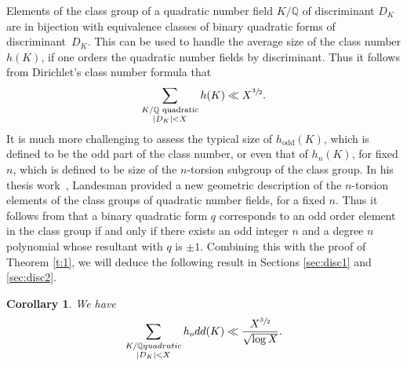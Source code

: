 \documentclass[11pt]{article}
\newcommand{\QQ}{\mathbb{Q}}\let\Q\QQ
\newtheorem{corollary}[theorem]{Corollary}
\numberwithin{equation}{section}
\begin{document}
Elements of the
class group of a quadratic number field $K/\QQ$ of discriminant $D_K$ are in bijection with equivalence classes
of binary quadratic forms of discriminant~$D_K$. This can be used to
handle the average size of the class number $h(K)$, if one orders the quadratic number fields by discriminant. Thus it follows from Dirichlet's class number formula that
\begin{equation}\label{eq:class}
\sum_{
\substack{K/\QQ \text{ quadratic}\\
|D_K| < X
}} h(K)\ll X^{\sfrac{3}{2}}.
\end{equation}
It is much more challenging to assess the typical size of
$h_\text{odd}(K)$, which is defined to be the odd part of the class number, or even that of
$h_n(K)$, for fixed $n$, which is defined to be size of the $n$-torsion subgroup of the class group.
In his thesis work~\cite{aaron}, Landesman provided
a new geometric description of the $n$-torsion elements of the class groups of quadratic number fields, for a fixed $n$. Thus it follows from
\cite[Th.\,1.1]{aaron} that a binary quadratic form $q$ corresponds to an odd order
element in the class group
if and only if there exists an odd integer $n$
and a degree $n$ polynomial whose resultant with $q$ is $\pm 1$. Combining this with the proof of
Theorem \ref{t:1}, we will deduce the following result in Sections \ref{sec:disc1} and \ref{sec:disc2}.

\begin{corollary}\label{cor:1.2}
We have
\[
\sum_{
\substack{K/\QQ \textup{ quadratic}\\
|D_K|<X
}} h_\textup{odd}(K)\ll \frac{X^{\sfrac{3}{2}}}{\sqrt{\log X}}.
\]
\end{corollary}
\end{document}
